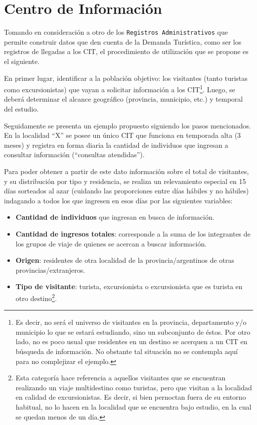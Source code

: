 \documentclass[
]{book}
\begin{document}
\hypertarget{centro-de-informaciuxf3n}{%
\section{Centro de Información}\label{centro-de-informaciuxf3n}}

Tomando en consideración a otro de los \texttt{Registros\ Administrativos} que permite construir datos que den cuenta de la Demanda Turística, como ser los registros de llegadas a los CIT, el procedimiento de utilización que se propone es el siguiente.

En primer lugar, identificar a la población objetivo: los visitantes (tanto turistas como excursionistas) que vayan a solicitar información a los CIT\footnote{Es decir, no será el universo de visitantes en la provincia, departamento y/o municipio lo que se estará estudiando, sino un subconjunto de éstos. Por otro lado, no es poco usual que residentes en un destino se acerquen a un CIT en búsqueda de información. No obstante tal situación no se contempla aquí para no complejizar el ejemplo.

  \hfill\break
}. Luego, se deberá determinar el alcance geográfico (provincia, municipio, etc.) y temporal del estudio.

Seguidamente se presenta un ejemplo propuesto siguiendo los pasos mencionados. En la localidad ``X'' se posee un único CIT que funciona en temporada alta (3 meses) y registra en forma diaria la cantidad de individuos que ingresan a consultar información (``consultas atendidas'').

Para poder obtener a partir de este dato información sobre el total de visitantes, y su distribución por tipo y residencia, se realiza un relevamiento especial en 15 días sorteados al azar (cuidando las proporciones entre días hábiles y no hábiles) indagando a todos los que ingresen en esos días por las siguientes variables:

\begin{itemize}
\item
  \textbf{Cantidad de individuos} que ingresan en busca de información.
\item
  \textbf{Cantidad de ingresos totales}: corresponde a la suma de los integrantes de los grupos de viaje de quienes se acercan a buscar información.
\item
  \textbf{Origen}: residentes de otra localidad de la provincia/argentinos de otras provincias/extranjeros.
\item
  \textbf{Tipo de visitante}: turista, excursionista o excursionista que es turista en otro destino\footnote{Esta categoría hace referencia a aquellos visitantes que se encuentran realizando un viaje multidestino como turistas, pero que visitan a la localidad en calidad de excursionistas. Es decir, si bien pernoctan fuera de su entorno habitual, no lo hacen en la localidad que se encuentra bajo estudio, en la cual se quedan menos de un día.}.
\end{itemize}
\end{document}
